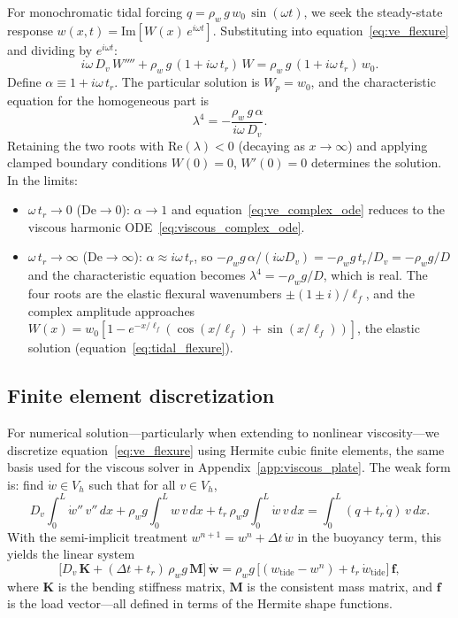 \documentclass[11pt]{article}
\begin{document}
For monochromatic tidal forcing $q = \rho_w\,g\,w_0\,\sin(\omega t)$, we seek the steady-state response $w(x,t) = \mathrm{Im}[W(x)\,e^{i\omega t}]$.  Substituting into equation~\eqref{eq:ve_flexure} and dividing by $e^{i\omega t}$:
\begin{equation}
  i\omega\,D_v\,W'''' + \rho_w\,g\,(1 + i\omega\,t_r)\,W = \rho_w\,g\,(1 + i\omega\,t_r)\,w_0.
  \label{eq:ve_complex_ode}
\end{equation}
Define $\alpha \equiv 1 + i\omega\,t_r$.  The particular solution is $W_p = w_0$, and the characteristic equation for the homogeneous part is
\begin{equation}
  \lambda^4 = -\frac{\rho_w\,g\,\alpha}{i\omega\,D_v}.
  \label{eq:ve_char}
\end{equation}
Retaining the two roots with $\mathrm{Re}(\lambda) < 0$ (decaying as $x \to \infty$) and applying clamped boundary conditions $W(0) = 0$, $W'(0) = 0$ determines the solution.  In the limits:
\begin{itemize}
  \item $\omega\,t_r \to 0$ ($\text{De} \to 0$): $\alpha \to 1$ and equation~\eqref{eq:ve_complex_ode} reduces to the viscous harmonic ODE~\eqref{eq:viscous_complex_ode}.
  \item $\omega\,t_r \to \infty$ ($\text{De} \to \infty$): $\alpha \approx i\omega\,t_r$, so $-\rho_w g\,\alpha/(i\omega D_v) = -\rho_w g\,t_r/D_v = -\rho_w g/D$ and the characteristic equation becomes $\lambda^4 = -\rho_w g/D$, which is real.  The four roots are the elastic flexural wavenumbers $\pm(1 \pm i)/\ell_f$, and the complex amplitude approaches $W(x) = w_0[1 - e^{-x/\ell_f}(\cos(x/\ell_f) + \sin(x/\ell_f))]$, the elastic solution (equation~\eqref{eq:tidal_flexure}).
\end{itemize}

\subsection*{Finite element discretization}

For numerical solution---particularly when extending to nonlinear viscosity---we discretize equation~\eqref{eq:ve_flexure} using Hermite cubic finite elements, the same basis used for the viscous solver in Appendix~\ref{app:viscous_plate}.  The weak form is: find $\dot{w} \in V_h$ such that for all $v \in V_h$,
\begin{equation}
  D_v\!\int_0^L \dot{w}''\,v''\,dx + \rho_w g\!\int_0^L w\,v\,dx + t_r\,\rho_w g\!\int_0^L \dot{w}\,v\,dx = \int_0^L (q + t_r\,\dot{q})\,v\,dx.
  \label{eq:ve_weak}
\end{equation}
With the semi-implicit treatment $w^{n+1} = w^n + \Delta t\,\dot{w}$ in the buoyancy term, this yields the linear system
\begin{equation}
  \bigl[D_v\,\mathbf{K} + (\Delta t + t_r)\,\rho_w g\,\mathbf{M}\bigr]\,\dot{\mathbf{w}} = \rho_w g\,\bigl[(w_{\text{tide}} - w^n) + t_r\,\dot{w}_{\text{tide}}\bigr]\,\mathbf{f},
  \label{eq:ve_fem_system}
\end{equation}
where $\mathbf{K}$ is the bending stiffness matrix, $\mathbf{M}$ is the consistent mass matrix, and $\mathbf{f}$ is the load vector---all defined in terms of the Hermite shape functions.
\end{document}
